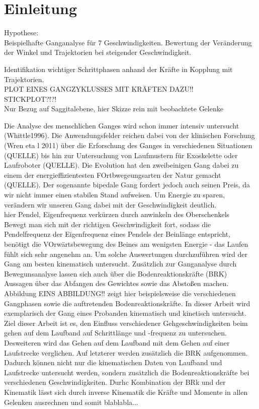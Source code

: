 \section{Einleitung}
Hypothese:\\
Beispielhafte Ganganalyse für 7 Geschwindigkeiten.
Bewertung der Veränderung der Winkel und Trajektorien bei steigender Geschwindigkeit.

Identifikation wichtiger Schrittphasen anhand der Kräfte in Kopplung mit Trajektorien.\\

PLOT EINES GANGZYKLUSSES MIT KRÄFTEN DAZU!!\\
STICKPLOT?!?!\\
Nur Bezug auf Saggitalebene, hier Skizze rein mit beobachtete Gelenke


Die Analyse des menschlichen Ganges wird schon immer intensiv untersucht (Whittle1996). Die Anwendungsfelder reichen dabei  von der klinischen Forschung (Wren eta l 2011) über die Erforschung des Ganges in verschiedenen Situationen (QUELLE) bis hin zur Untersuchung von Laufmustern für Exoskelette oder Laufroboter (QUELLE). Die Evolution hat den zweibeinigen Gang dabei zu einem der energieffizientesten FOrtbwegeungsarten der Natur gemacht (QUELLE). Der sogenannte bipedale Gang fordert jedoch auch seinen Preis, da wir nicht immer einen stabilen Stand aufweisen. Um Energie zu sparen, verändern wir unseren Gang dabei mit der Geschwindigkeit deutlich.\\
hier Pendel, Eigenfrequenz verkürzen durch anwinkeln des Oberschenkels\\
Bewegt man sich mit der richtigen Geschwindigkeit fort, sodass die Pendelfrequenz der Eigenfrequenz eines Pendels der Beinlänge entspricht, benötigt die VOrwärtsbewegung des Beines am wenigsten Energie - das Laufen fühlt sich sehr angenehm an. Um solche Auswertungen durchzuführen wird der Gang am besten kinematisch untersucht. Zusätzlich zur Ganganalyse durch Bewegunsanalyse lassen sich auch über die Bodenreaktionskräfte (BRK) Aussagen über das Abfangen des Gewichtes sowie das Abstoßen machen. Abbildung EINS ABBILDUNG!! zeigt hier beispielsweise die verschiedenen Gangphasen sowie die auftretenden Bodenreaktionskräfte.
In dieser Arbeit wird exemplarisch der Gang eines Probanden kinematisch und kinetisch untersucht. Ziel dieser Arbeit ist es, den Einfluss verschiedener Gehgeschwindigkeiten beim gehen auf dem Laufband auf Schrittlänge und -frequenz zu untersuchen. Desweiteren wird das Gehen auf dem Laufband mit dem Gehen auf einer Laufstrecke verglichen. Auf letzterer werden zusätzlich die BRK aufgenommen. Dadurch können nicht nur die kinematischen Daten von Laufband und Laufstrecke untersucht werden, sondern zusätzlich die Bodenreaktionskräfte bei verschiedenen Geschwindigkeiten. Durhc Kombination der BRk und der Kinematik lässt sich durch inverse Kinematik die Kräfte und Momente in allen Gelenken ausrechnen und somit blablabla...

